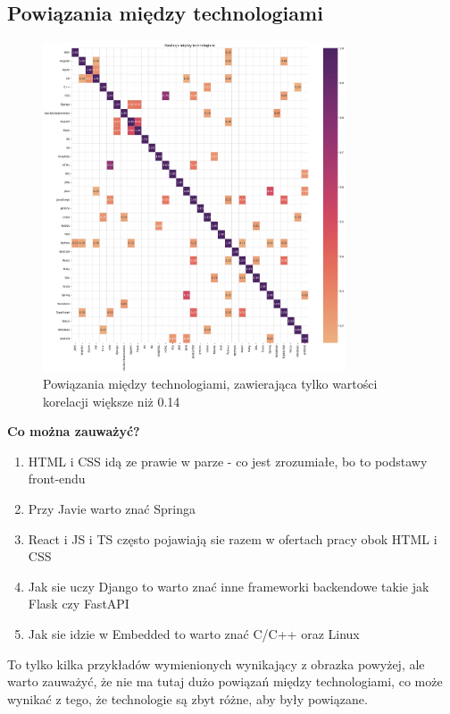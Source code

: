 \documentclass{article}
\begin{document}
\subsection{Powiązania między technologiami}

\begin{figure}[H]
    \centering
    \includegraphics[width=0.8\textwidth]{../analysis/plots/korelacje/powiązania_technologii.png}
    \caption{Powiązania między technologiami, zawierająca tylko wartości korelacji większe niż 0.14}
\end{figure}

\quad \textbf{Co można zauważyć?}

\begin{enumerate}
    \item HTML i CSS idą ze prawie w parze - co jest zrozumiałe, bo to podstawy front-endu
    \item Przy Javie warto znać Springa
    \item React i JS i TS często pojawiają sie razem w ofertach pracy obok HTML i CSS
    \item Jak sie uczy Django to warto znać inne frameworki backendowe takie jak Flask czy FastAPI
    \item Jak sie idzie w Embedded to warto znać C/C++ oraz Linux
\end{enumerate}

\quad To tylko kilka przykładów wymienionych wynikający z obrazka powyżej, ale warto zauważyć, że nie ma tutaj dużo
powiązań między technologiami, co może wynikać z tego, że technologie są zbyt różne, aby były powiązane.
\end{document}
